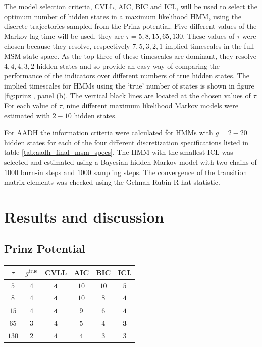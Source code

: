 The model selection criteria, CVLL, AIC, BIC and ICL, will be used to select the optimum number of hidden states in a maximum likelihood HMM, using the discrete trajectories sampled from the Prinz potential. Five different values of the Markov lag time will be used, they are $\tau=5, 8, 15, 65, 130$. These values of $\tau$ were chosen because they resolve, respectively $7, 5, 3, 2, 1$ implied timescales in the full MSM state space. As the top three of these timescales are dominant, they resolve $4, 4, 4, 3, 2$ hidden states and so provide an easy way of comparing the performance of the indicators over different numbers of true hidden states\cite{noeProjectedHiddenMarkov2013a}. The implied timescales for HMMs using the `true' number of states is shown in figure \ref{fig:prinz}, panel (b). The vertical black lines are located at the chosen values of $\tau$. For each value of $\tau$, nine different maximum likelihood Markov models were estimated with $2 - 10$ hidden states. 

For AADH the information criteria were calculated for HMMs with $g = 2 - 20$ hidden states for each of the four different discretization specifications listed in table \ref{tab:aadh_final_msm_specs}.  The HMM with the smallest ICL was selected and estimated using a Bayesian hidden Markov model with two chains of  $1000$ burn-in steps and $1000$ sampling steps. The convergence of the transition matrix elements was checked using the Gelman-Rubin R-hat statistic. 

\section{Results and discussion}\label{sec:hmm_results}
\subsection{Prinz Potential}

\begin{table}
    \centering
    \begin{tabular}{|c|c|c|c|c|c|}
    \hline
    $\tau$ & $g^{\mathrm{true}}$ & CVLL & AIC & BIC & ICL  \\
    \hline\hline
     $5$  & $4$ & $\mathbf{4}$  & $10$ & $10$ & $5$ \\
     $8$  & $4$ & $\mathbf{4}$ & $10$ & $8$  & $\mathbf{4}$  \\
     $15$ & $4$ & $\mathbf{4}$  & $9$  & $6$  & $\mathbf{4}$  \\
     $65 $& $3$ & $4$  & $5$  & $4$  & $\mathbf{3}$  \\
     $130$& $2$ & $4$  & $4$  & $3$  & $3$  \\
     \hline
    \end{tabular}
    \label{tab:prinz_criteria_results}
\end{table}

